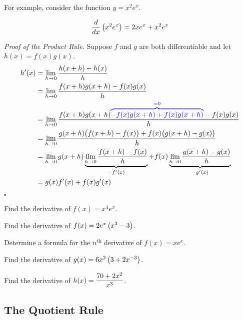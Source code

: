 \documentclass[12pt]{article}
\begin{document}
\vspace{5mm} For example, consider the function $y=x^2e^x$.

$$\frac{d}{dx}\left( x^2 e^x\right) = 2xe^x+x^2e^x$$

\newpage

\textit{Proof of the Product Rule.} Suppose $f$ and $g$ are both differentiable and let $h(x)=f(x)g(x)$.
\begin{align*}
h'(x) &= \lim_{h\to 0}\frac{h(x+h)-h(x)}{h} \\
&= \lim_{h\to 0}\frac{f(x+h)g(x+h)-f(x)g(x)}{h}\\
&= \lim_{h\to 0}\frac{f(x+h)g(x+h) {\color{blue}\overbrace{- f(x)g(x+h) + f(x)g(x+h)}^{=0}} - f(x)g(x)}{h}\\
&= \lim_{h\to 0}\frac{g(x+h)\big(f(x+h) - f(x)\big) + f(x)\big(g(x+h) - g(x)\big)}{h} \\
	      &= \lim_{h\to 0}g(x+h)\underbrace{\lim_{h\to 0}\frac{f(x+h)-f(x)}{h}}_{=f'(x)} + f(x)\underbrace{\lim_{h\to 0}\frac{g(x+h) - g(x)}{h}}_{=g'(x)} \\
	      &= g(x) f'(x) + f(x) g'(x)
\end{align*}
\begin{flushright}
	$\square$
\end{flushright}

\Example Find the derivative of $f(x)=x^4e^x$.

\vspace{50mm}

\Example Find the derivative of $f(x)=2e^x\left( x^3-3\right)$.

\newpage

\Example Determine a formula for the $n^\text{th}$ derivative of $f(x)=xe^x$.

\vspace{60mm}

\Example Find the derivative of $g(x)=6x^2\left( 3+2x^{-3}\right)$.

\vspace{50mm}

\Example Find the derivative of $h(x)=\displaystyle\frac{70+2x^2}{x^3}$.

\newpage

\subsection*{The Quotient Rule}

\end{document}

